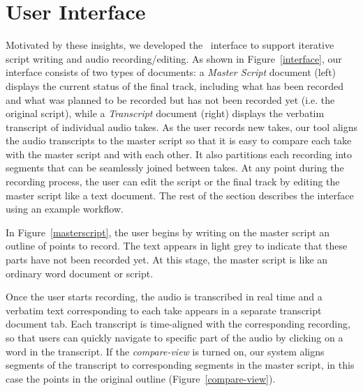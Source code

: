 \section{User Interface}
Motivated by these insights, we developed the \systemname\  interface to support iterative script writing and  audio recording/editing. As shown in Figure~\ref{interface}, our interface consists of two types of documents: a \textit{Master Script} document (left) displays the current status of the final track, including what has been recorded and what was planned to be recorded but has not been recorded yet (i.e. the original script), while a \textit{Transcript} document (right) displays the verbatim transcript of individual audio takes. As the user records new takes, our tool aligns the audio transcripts to the master script so that it is easy to compare each take with the master script and with each other. It also partitions each recording into segments that can be seamlessly joined between takes. At any point during the recording process, the user can edit the script or the final track by editing the master script like a text document. The rest of the section describes the interface using an example workflow. 

In Figure~\ref{masterscript}, the user begins by writing on the master script an outline  of points to record. The text appears in light grey to indicate that these parts have not been recorded yet. At this stage, the master script is like an ordinary
word document or script. 

Once the user starts recording, the audio is transcribed in real time and a verbatim text corresponding to each take appears in a separate transcript document tab. Each transcript is time-aligned with the corresponding recording, so that users can quickly navigate to specific
part of the audio by clicking on a word in the transcript. If the \textit{compare-view} is turned on, our system aligns segments of the transcript to corresponding segments in the master script, in this case the points in the original outline (Figure~\ref{compare-view}).


